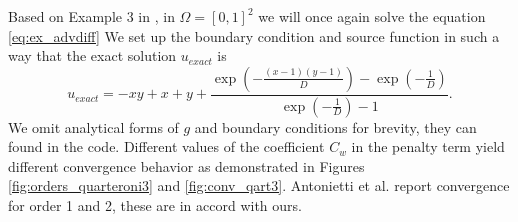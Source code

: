\begin{example}
\label{ex:quart3}
Based on Example 3 in \cite{Antonietti2013},
in $\Omega = [0, 1]^2$ we will once again solve the equation \eqref{eq:ex_advdiff}
We set up the boundary condition and source function in such a way that the exact
solution $u_{exact}$ is
\begin{equation}
	u_{exact} = -xy + x +y + \frac{\exp{\left(-\frac{{\left(x - 1\right)} {\left(y -
	1\right)}}{D}\right)} -
	\exp{\left(-\frac{1}{D}\right)}}{\exp{\left(-\frac{1}{D}\right)}
	- 1}.
\end{equation}
We omit analytical forms of $g$ and boundary conditions for brevity, they can found in
the code. Different values of the coefficient $C_w$ in the penalty term yield different
convergence behavior as demonstrated in Figures \ref{fig:orders_quarteroni3} and 
\ref{fig:conv_qart3}. Antonietti et al. \cite{Antonietti2013} report convergence
for order 1 and 2, these are in accord with ours. \todo


\end{example}
